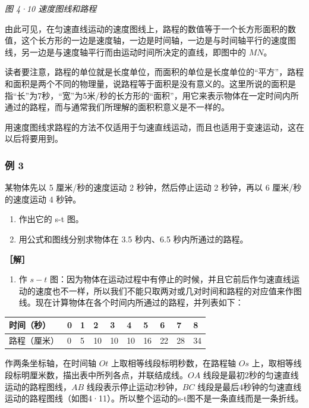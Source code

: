 \emph{图 4·10 速度图线和路程}

由此可见，在匀速直线运动的速度图线上，路程的数值等于一个长方形面积的数值，这个长方形的一边是速度轴，一边是时间轴，一边是与时间轴平行的速度图线，另一边是与速度轴平行而由运动时间所决定的直线，即图中的
\(MN\)。

读者要注意，路程的单位就是长度单位，而面积的单位是长度单位的``平方''，路程和面积是两个不同的物理量，说路程等于面积是没有意义的。这里所说的面积是指``长''为7秒，``宽''为5米/秒的长方形的``面积''，用它来表示物体在一定时间内所通过的路程，而与通常我们所理解的面积积意义是不一样的。

用速度图线求路程的方法不仅适用于匀速直线运动，而且也适用于变速运动，这在以后将要用到。

\subsubsection{例 3}\label{ux4f8b-3-2}

某物体先以 5 厘米/秒的速度运动 2 秒钟，然后停止运动 2 秒钟，再以 6
厘米/秒的速度运动 4 秒钟。

\begin{enumerate}
\def\labelenumi{\arabic{enumi}.}
\item
  作出它的 s-t 图。
\item
  用公式和图线分别求物体在 3.5 秒内、6.5 秒内所通过的路程。
\end{enumerate}

\textbf{［解］}

\begin{enumerate}
\def\labelenumi{\arabic{enumi}.}
\tightlist
\item
  作 \(s - t\)
  图：因为物体在运动过程中有停止的时候，并且它前后作匀速直线运动的速度也不一样，所以我们不能只取两对或几对时间和路程的对应值来作图线。现在计算物体在各个时间内所通过的路程，并列表如下：
\end{enumerate}

{\def\LTcaptype{none} %
\begin{longtable}[]{@{}llllllllll@{}}
\toprule\noalign{}
时间（秒） & 0 & 1 & 2 & 3 & 4 & 5 & 6 & 7 & 8 \\
\midrule\noalign{}
\endhead
\bottomrule\noalign{}
\endlastfoot
路程（厘米） & 0 & 5 & 10 & 10 & 10 & 16 & 22 & 28 & 34 \\
\end{longtable}
}

作两条坐标轴，在时间轴 \(Ot\) 上取相等线段标明秒数，在路程轴 \(Os\)
上，取相等线段标明厘米数，描出表中所列各点，并联结成线。\(OA\)
线段是最初2秒的匀速直线运动的路程图线，\(AB\)
线段表示停止运动2秒钟，\(BC\)
线段是最后4秒钟的匀速直线运动的路程图线（如图4·11）。所以整个运动的s-t图不是一条直线而是一条折线。

